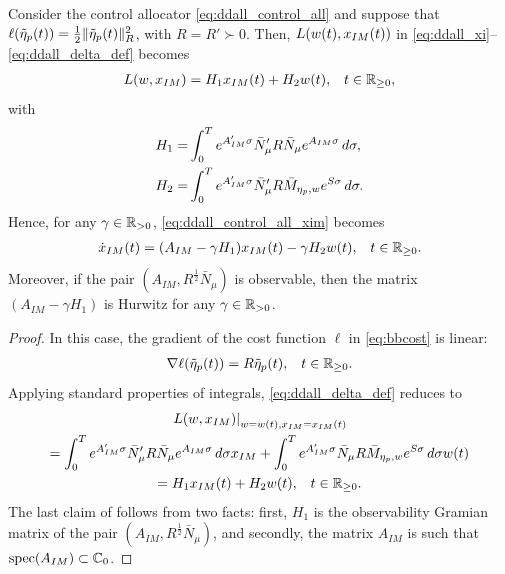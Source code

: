 \begin{proposition}
  \label{prop:ddall_delay_quadratic}
  Consider the control allocator \eqref{eq:ddall_control_all} and suppose that $\ell(\tilde{\eta}_p(t)) = \frac{1}{2}\|\tilde{\eta}_p(t)\|^{2}_R$, with $R = R' \succ 0$. Then, $L(w(t),x_{IM}(t))$ in \eqref{eq:ddall_xi}--\eqref{eq:ddall_delta_def} becomes
	\begin{align}
    \label{eq:ddall_delta_quadratic}
		L(w,x_{IM}) &= H_1 x_{IM}(t) +	H_2 w(t), & t\in\mathbb{R}_{\geq 0},
  \end{align}
  with
	\begin{subequations}
    \label{eq:ddall_H}
		\begin{align}
      H_1 = & \int_0^{T} e^{A_{IM}' \sigma} \bar{N}_{\mu}' R \bar{N}_{\mu}e^{A_{IM} \sigma}\,d\sigma, \\
      H_2 = & \int_0^{T} e^{A_{IM}' \sigma} \bar{N}_{\mu}' R \bar{M}_{\eta_p,w}e^{S\sigma}\,d\sigma.
    \end{align}
	\end{subequations}
  Hence, for any $\gamma\in\mathbb{R}_{> 0}$, \eqref{eq:ddall_control_all_xim} becomes
  \begin{align}
    \label{eq:ddall_ss_opt_quadratic}
    \dot{x}_{IM}(t) &=	(A_{IM}-\gamma H_1) x_{IM}(t) - \gamma H_2 w(t), & t\in\mathbb{R}_{\geq 0}.
  \end{align}
	Moreover, if the pair $(A_{IM},R^{\frac{1}{2}}\bar{N}_{\mu})$ is observable, then the matrix $(A_{IM}-\gamma H_1)$ is Hurwitz for any $\gamma\in\mathbb{R}_{> 0}$.

  \closestatement
\end{proposition}
\begin{proof}
  In this case, the gradient of the cost function $\ell$ in \eqref{eq:bbcost} is linear:
  \begin{align}
    \nabla\ell(\tilde{\eta}_p(t)) &= R\tilde{\eta}_p(t), & t\in\mathbb{R}_{\geq 0}.
  \end{align}
  Applying standard properties of integrals, \eqref{eq:ddall_delta_def} reduces to
  \begin{multline}
    \left.L(w,x_{IM})\right|_{w=w(t),x_{IM}=x_{IM}(t)}\\
    =\int_{0}^{T} e^{A_{IM}'\sigma}\bar{N}_{\mu}'R\bar{N}_{\mu}e^{A_{IM}\sigma}\,d\sigma x_{IM} + \int_{0}^{T} e^{A_{IM}'\sigma}\bar{N}_{\mu}R\bar{M}_{\eta_p,w}e^{S\sigma}\,d\sigma w(t)\\
    \begin{aligned}= H_1 x_{IM}(t) + H_2 w(t), && t\in\mathbb{R}_{\geq 0}.\end{aligned}
  \end{multline}
  The last claim of  follows from two facts: first, $H_1$ is the observability Gramian matrix of the pair $(A_{IM},R^{\frac{1}{2}}\bar{N}_{\mu})$, and secondly, the matrix $A_{IM}$ is such that $\operatorname{spec}(A_{IM})\subset\mathbb{C}_{0}$.
\end{proof}

